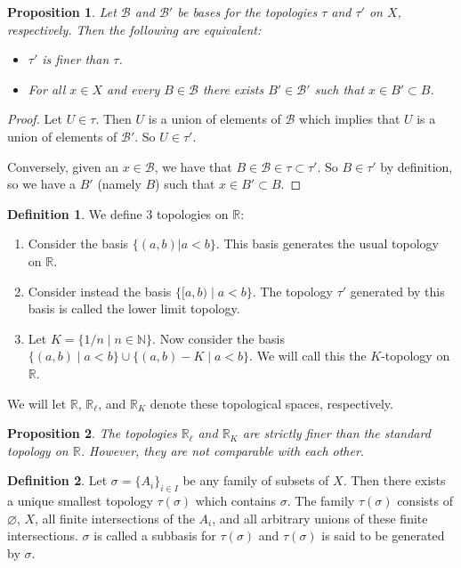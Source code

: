 \documentclass[12pt]{article}
\theoremstyle{plain}
\newtheorem{proposition}{Proposition}
\theoremstyle{definition}
\newtheorem{definition}{Definition}
\begin{document}
\begin{proposition}
Let $\mathcal{B}$ and $\mathcal{B}'$ be bases for the topologies $\tau$ and $\tau'$ on $X$, respectively. Then the following are equivalent:
\begin{itemize}
	\item $\tau'$ is finer than $\tau$.
	\item For all $x \in X$ and every $B \in \mathcal{B}$ there exists $B' \in \mathcal{B}'$ such that $x \in B' \subset B$.
\end{itemize}
\end{proposition}
\begin{proof}
Let $U \in \tau$. Then $U$ is a union of elements of $\mathcal{B}$ which implies that $U$ is a union of elements of $\mathcal{B}'$. So $U \in \tau'$. 

Conversely, given an $x \in \mathcal{B}$, we have that $B \in \mathcal{B} \in \tau \subset \tau'$. So $B \in \tau'$ by definition, so we have a $B'$ (namely $B$) such that $x \in B' \subset B$.
\end{proof}

\begin{definition}
We define $3$ topologies on $\mathbb{R}$:
\begin{enumerate}
	\item Consider the basis $\{(a,b) | a < b\}$. This basis generates the usual topology on $\mathbb{R}$.
	\item Consider instead the basis $\{[a,b) \mid a < b\}$. The topology $\tau'$ generated by this basis is called the lower limit topology.
	\item Let $K = \{1/n \mid n \in \mathbb{N}\}$. Now consider the basis $\{(a, b) \mid a < b\} \cup \{(a, b) - K \mid a < b\}$. We will call this the $K$-topology on $\mathbb{R}$.
\end{enumerate}
We will let $\mathbb{R}$, $\mathbb{R}_{\ell}$, and $\mathbb{R}_K$ denote these topological spaces, respectively.
\end{definition}

\begin{proposition}
The topologies $\mathbb{R}_{\ell}$ and $\mathbb{R}_K$ are strictly finer than the standard topology on $\mathbb{R}$. However, they are not comparable with each other.
\end{proposition}

\begin{definition}
Let $\sigma = \{A_i\}_{i \in I}$ be any family of subsets of $X$. Then there exists a unique smallest topology $\tau(\sigma)$ which contains $\sigma$. The family $\tau(\sigma)$ consists of $\varnothing$, $X$, all finite intersections of the $A_i$, and all arbitrary unions of these finite intersections. $\sigma$ is called a subbasis for $\tau(\sigma)$ and $\tau(\sigma)$ is said to be generated by $\sigma$.
\end{definition}
\end{document}
